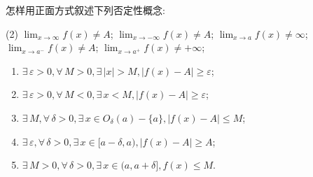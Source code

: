      \begin{exercise}
         怎样用正面方式叙述下列否定性概念:
         \begin{tasks}
             (2)
             \task $\lim_{x\to \infty}f(x)\neq A$;
             \task $\lim_{x\to -\infty}f(x)\neq A$;
             \task $\lim_{x\to a}f(x)\neq \infty$;
             \task $\lim_{x\to a^-}f(x)\neq A$;
             \task $\lim_{x\to a^+}f(x)\neq +\infty$;
         \end{tasks}
     \end{exercise}
     \begin{solution}
         \begin{enumerate}
             \item $\exists\, \varepsilon>0, \forall\, M>0, \exists\, |x|>M, |f(x)-A|\geqslant \varepsilon$;
             \item $\exists\, \varepsilon>0, \forall\, M<0, \exists\, x<M, |f(x)-A|\geqslant \varepsilon$;
             \item $\exists\, M, \forall\, \delta>0, \exists\, x\in O_\delta(a)-\{a\}, |f(x)-A|\leqslant  M$;
             \item $\exists\, \varepsilon, \forall\, \delta>0, \exists\, x\in [a-\delta,a), |f(x)-A|\geqslant A$;
             \item $\exists\, M>0, \forall\, \delta>0, \exists\, x\in (a,a+\delta], f(x)\leqslant M$.
         \end{enumerate}
     \end{solution}
